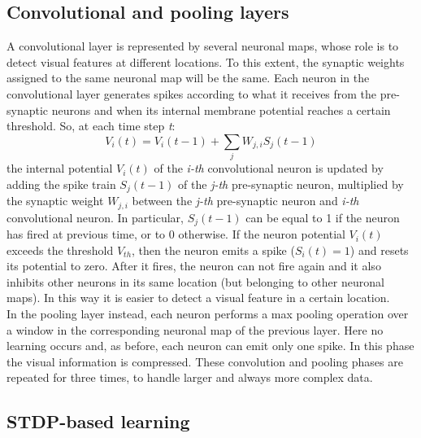 \documentclass[11pt,a4paper]{scrartcl}
\begin{document}
\subsection{Convolutional and pooling layers}

A convolutional layer is represented by several neuronal maps, whose role is to detect visual features at different locations. To this extent, the synaptic weights assigned to the same neuronal map will be the same. Each neuron in the convolutional layer generates spikes according to what it receives from the pre-synaptic neurons and when its internal membrane potential reaches a certain threshold. So, at each time step \textit{t}:
\begin{equation*}
	V_{i}(t) = V_{i}(t-1) + \sum_{j}W_{j,i}S_{j}(t-1)
\end{equation*}
the internal potential $ V_{i}(t) $ of the \textit{i-th} convolutional neuron is updated by adding the spike train $ S_{j}(t-1) $ of the \textit{j-th} pre-synaptic neuron, multiplied by the synaptic weight $ W_{j,i} $ between the \textit{j-th} pre-synaptic neuron and \textit{i-th} convolutional neuron. In particular, $ S_{j}(t-1) $ can be equal to 1 if the neuron has fired at previous time, or to 0 otherwise. If the neuron potential $ V_{i}(t) $ exceeds the threshold $ V_{th} $, then the neuron emits a spike ($ S_{i}(t) = 1 $) and resets its potential to zero. After it fires, the neuron can not fire again and it also inhibits other neurons in its same location (but belonging to other neuronal maps). In this way it is easier to detect a visual feature in a certain location.\\
In the pooling layer instead, each neuron performs a max pooling operation over a window in the corresponding neuronal map of the previous layer. Here no learning occurs and, as before, each neuron can emit only one spike. In this phase the visual information is compressed. These convolution and pooling phases are repeated for three times, to handle larger and always more complex data.

\subsection{STDP-based learning}
\end{document}
